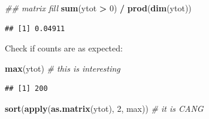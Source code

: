 \documentclass[12pt,]{book}
\newenvironment{Shaded}{\begin{snugshade}}{\end{snugshade}}
\newcommand{\CommentTok}[1]{\textcolor[rgb]{0.56,0.35,0.01}{\textit{#1}}}
\newcommand{\DecValTok}[1]{\textcolor[rgb]{0.00,0.00,0.81}{#1}}
\newcommand{\KeywordTok}[1]{\textcolor[rgb]{0.13,0.29,0.53}{\textbf{#1}}}
\newcommand{\NormalTok}[1]{#1}
\newcommand{\OperatorTok}[1]{\textcolor[rgb]{0.81,0.36,0.00}{\textbf{#1}}}
\newcommand{\StringTok}[1]{\textcolor[rgb]{0.31,0.60,0.02}{#1}}
\begin{document}
\begin{Shaded}
\begin{Highlighting}[]
\CommentTok{## matrix fill}
\KeywordTok{sum}\NormalTok{(ytot }\OperatorTok{>}\StringTok{ }\DecValTok{0}\NormalTok{) }\OperatorTok{/}\StringTok{ }\KeywordTok{prod}\NormalTok{(}\KeywordTok{dim}\NormalTok{(ytot))}
\end{Highlighting}
\end{Shaded}

\begin{verbatim}
## [1] 0.04911
\end{verbatim}

Check if counts are as expected:

\begin{Shaded}
\begin{Highlighting}[]
\KeywordTok{max}\NormalTok{(ytot) }\CommentTok{# this is interesting}
\end{Highlighting}
\end{Shaded}

\begin{verbatim}
## [1] 200
\end{verbatim}

\begin{Shaded}
\begin{Highlighting}[]
\KeywordTok{sort}\NormalTok{(}\KeywordTok{apply}\NormalTok{(}\KeywordTok{as.matrix}\NormalTok{(ytot), }\DecValTok{2}\NormalTok{, max)) }\CommentTok{# it is CANG}
\end{Highlighting}
\end{Shaded}
\end{document}
